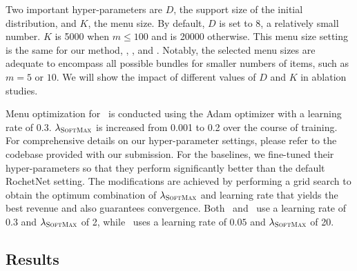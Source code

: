 Two important hyper-parameters are $D$, the support size of the initial distribution, and $K$, the menu size. By default, $D$ is set to 8, a relatively small number. $K$ is 5000 when $m\le 100$ and is 20000 otherwise. This menu size setting is the same for our method, \smallbundle, \bigbundle, and \bundle.
Notably, the selected menu sizes are adequate to encompass all possible bundles for smaller numbers of items, such as $m=5$ or $10$. We will show the impact of different values of $D$ and $K$ in ablation studies. 

Menu optimization for \name~is conducted using the Adam optimizer with a learning rate of 0.3. $\lambda_{\textsc{SoftMax}}$ is increased from 0.001 to 0.2 over the course of training. For comprehensive details on our hyper-parameter settings, please refer to the codebase  provided with our submission. For the baselines, we fine-tuned their hyper-parameters so that they perform significantly better than the default RochetNet setting. The modifications are achieved by performing a grid search to obtain the optimum combination of $\lambda_{\textsc{SoftMax}}$ and learning rate that yields the best revenue and also guarantees convergence. Both \smallbundle~and \bigbundle~use a learning rate of $0.3$ and $\lambda_{\textsc{SoftMax}}$ of 2, while \bundle~uses a learning rate of $0.05$ and $\lambda_{\textsc{SoftMax}}$ of 20.



\subsection{Results}


